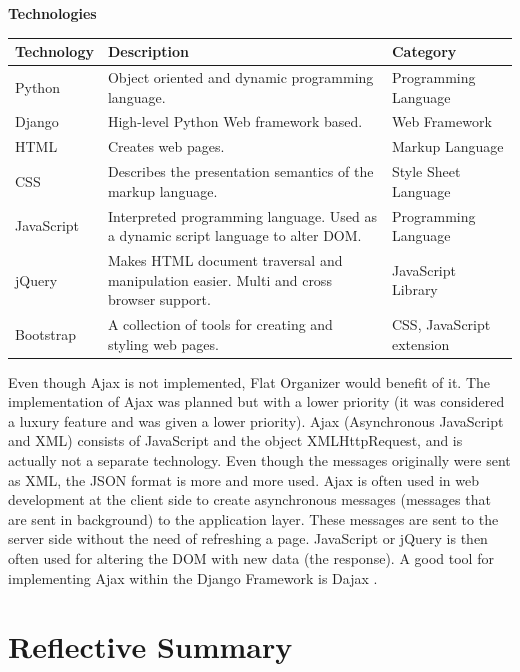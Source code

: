 \documentclass{sig-alt-release2}
\begin{document}
\vspace{5 mm}
\noindent \textbf{Technologies}

\begin{center}
    \begin{tabular}{ | p{1.7cm} | p{3.5cm} | p{2cm} |}
    \hline
	 \textbf{Technology} & \textbf{Description} & \textbf{Category} \\ \hline
	
	Python & Object oriented and dynamic programming language. &	Programming Language \\ \hline
	Django & High-level Python Web framework based.&	Web Framework \\ \hline
	HTML & Creates web pages.	&Markup Language \\ \hline
	CSS	& Describes the presentation semantics of the markup language.&	Style Sheet Language \\ \hline
	JavaScript & Interpreted programming language. Used as a dynamic script language to alter DOM. & Programming Language \\ \hline
	jQuery & Makes HTML document traversal and manipulation easier. Multi and cross browser support. &	JavaScript Library \\ \hline
	Bootstrap & A collection of tools for creating and styling web pages. & CSS, JavaScript extension \\
	
    \hline
    \end{tabular}
\end{center}

Even though Ajax is not implemented, Flat Organizer would benefit of it. The
implementation of Ajax was planned but with a lower priority (it was considered
a luxury feature and was given a lower priority). Ajax (Asynchronous JavaScript
and XML) consists of JavaScript and the object XMLHttpRequest, and is actually
not a separate technology. Even though the messages originally were sent as XML,
the JSON format is more and more used. Ajax is often used in web development at
the client side to create asynchronous messages (messages that are sent in
background) to the application layer. These messages are sent to the server side
without the need of refreshing a page. JavaScript or jQuery is then often used
for altering the DOM with new data (the response). A good tool for implementing
Ajax within the Django Framework is Dajax \cite{x20}.

\section{Reflective Summary}
\end{document}
